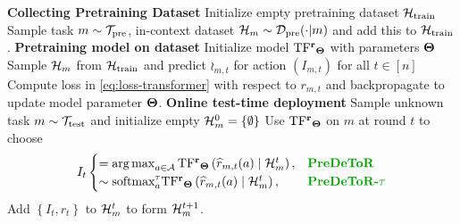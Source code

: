 \begin{algorithm}[!tbh]
\caption{\textbf{Pre}-trained \textbf{De}cision \textbf{T}ransf\textbf{o}rmer with \textbf{R}eward Estimation (\pred)}
\label{alg:pred}
    \begin{algorithmic}[1]
    \STATE \textbf{Collecting Pretraining Dataset} 
    \STATE Initialize empty pretraining dataset $\mathcal{H}_{\text{train}}$
    \STATE Sample task $m \sim \mathcal{T}_{\text{pre}}$, in-context dataset $\mathcal{H}_m \sim \mathcal{D}_{\text{pre}}(\cdot | m)$ and add this to $\mathcal{H}_{\text{train}}$.
    \ENDFOR
    \STATE \textbf{Pretraining model on dataset}
    \STATE Initialize model $\mathrm{TF^{\mathbf{r}}}_{\mathbf{\Theta}}$ with parameters $\mathbf{\Theta}$
    \STATE Sample $\mathcal{H}_m$ from $\mathcal{H}_{\text{train}}$ and predict $\wr_{m,t}$ for action $(I_{m,t})$ for all $t \in[n]$
    \STATE Compute loss in \eqref{eq:loss-transformer} with respect to $r_{m,t}$ and backpropagate to update model parameter $\mathbf{\Theta}$.
    \ENDWHILE
    \STATE \textbf{Online test-time deployment}
    \STATE Sample unknown task $m \sim \mathcal{T}_{\text{test}}$ and initialize empty $\mathcal{H}_m^{0}=\{\emptyset\}$
    \STATE Use $\mathrm{TF^{\mathbf{r}}}_{\mathbf{\Theta}}$ on $m$ at round $t$ to choose 
    \begin{align*}
        I_t \begin{cases}
            = \argmax_{a\in\A} \rT_{\bTheta}\left( \wr_{m,t}(a) \mid \H^t_m\right), & \textbf{\pred} \\
            \sim \textrm{softmax}^\tau_a \rT_{\bTheta}\left( \wr_{m,t}(a) \mid \H^t_m\right), & \textbf{\predt}
        \end{cases}
    \end{align*}
    \STATE Add $\left\{I_t, r_t\right\}$ to $\mathcal{H}_m^t$ to form $\mathcal{H}_m^{t+1}$.
    \ENDFOR
    \end{algorithmic}
\end{algorithm}
\vspace*{-0.5em}



